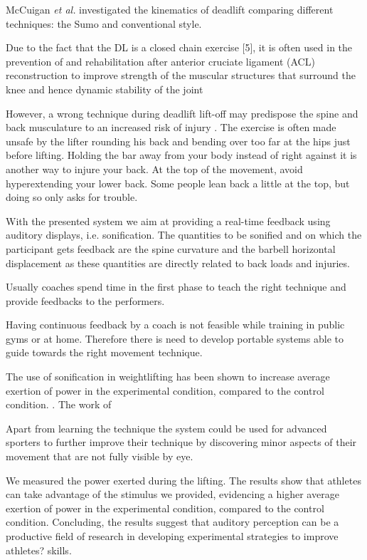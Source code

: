 \documentclass[10pt,letterpaper]{article}
\begin{document}
McCuigan \emph{et al.} investigated the kinematics of deadlift comparing different techniques: the Sumo and conventional style.

Due to the fact that the DL is a closed chain exercise [5], it is often used in the prevention of and rehabilitation after anterior cruciate ligament (ACL) reconstruction to improve strength of the muscular structures that surround the knee and hence dynamic stability of the joint 

However, a wrong technique during deadlift lift-off may predispose the spine and back musculature to an increased risk of injury \cite{granhed1987loads,cholewicki1991lumbar}. The exercise is often made unsafe by the lifter rounding his back and bending over too far at the hips just before lifting. Holding the bar away from your body instead of right against it is another way to injure your back. At the top of the movement, avoid hyperextending your lower back. Some people lean back a little at the top, but doing so only asks for trouble.


With the presented system we aim at providing a real-time feedback using auditory displays, i.e. sonification. The quantities to be sonified and on which the participant gets feedback are the spine curvature and the barbell horizontal displacement as these quantities are directly related to back loads and injuries.

Usually coaches spend time in the first phase to teach the right technique and provide feedbacks to the performers.

Having continuous feedback by a coach is not feasible while training in public gyms or at home. Therefore there is need to develop portable systems able to guide towards the right movement technique.


The use of sonification in weightlifting has been shown to increase average exertion of power in the experimental condition, compared to the control condition. \cite{murgia2012using}. The work of







Apart from learning the technique the system could be used for advanced sporters to further improve their technique by discovering minor aspects of their movement that are not fully visible by eye.



We measured the power exerted during the lifting. The results show that athletes can take advantage of the stimulus we provided, evidencing a higher average exertion of power in the experimental condition, compared to the control condition. Concluding, the results suggest that auditory perception can be a productive field of research in developing experimental strategies to improve athletes? skills.
\end{document}
